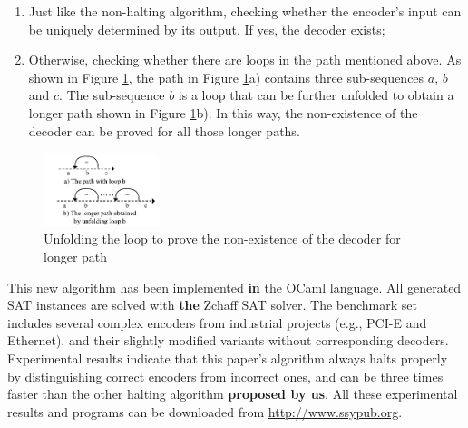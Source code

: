 \documentclass[journal]{IEEEtran}
\begin{document}
\begin{enumerate}
 \item Just like the non-halting algorithm\cite{ShengYuShen:iccad09,ShengYuShen:tcad},
       checking whether the encoder's input can be uniquely determined by its output.
      If yes, the decoder exists;
 \item Otherwise,
       checking whether there are loops in the path mentioned above.
       As shown in Figure \ref{doubleloop_unfold_cmp_simple},
       the path in Figure \ref{doubleloop_unfold_cmp_simple}a) contains three sub-sequences $a$, $b$ and $c$.
       The sub-sequence $b$ is a loop
       that can be further unfolded to obtain a longer path shown in Figure \ref{doubleloop_unfold_cmp_simple}b).
       In this way,
       the non-existence of the decoder can be proved for all those longer paths.
\end{enumerate}

\begin{figure}[b]
\begin{center}
\includegraphics[width=0.3\textwidth]{doubleloop_unfold_cmp_simple}
\end{center}
\caption{Unfolding the loop to prove the non-existence of the decoder for longer path}
  \label{doubleloop_unfold_cmp_simple}
\end{figure}

This new algorithm has been implemented \textbf{in} the OCaml language.
All generated SAT instances are solved with \textbf{the} Zchaff SAT solver\cite{CHAFF}.
The benchmark set includes several complex encoders from industrial projects
(e.g.,
PCI-E\cite{PCIESPEC} and Ethernet\cite{IEEE80232002}),
and their slightly modified variants without corresponding decoders.
Experimental results indicate that
this paper's algorithm always halts properly by distinguishing correct encoders from incorrect ones,
and can be three times faster than the other halting algorithm\cite{ShengYuShen:fmcad10} \textbf{proposed by us}.
All these experimental results and programs can be downloaded from \url{http://www.ssypub.org}.
\end{document}
